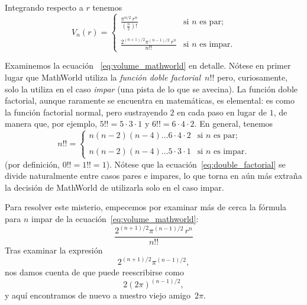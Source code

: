 Integrando respecto a $r$ tenemos
\begin{equation}
\label{eq:volume_mathworld}
V_n(r) = \begin{cases}
\displaystyle \frac{\pi^{n/2}\,r^n}{(\frac{n}{2})!} & \text{si } n \text{ es par}; \\ \\
\displaystyle \frac{2^{(n+1)/2}\pi^{(n-1)/2}\,r^n}{n!!} & \text{si } n \text{ es impar}.
\end{cases}
\end{equation}

Examinemos la ecuación ~\eqref{eq:volume_mathworld} en detalle. Nótese en primer lugar que MathWorld utiliza la \emph{función doble factorial}~$n!!$ pero, curiosamente, solo la utiliza en el caso \emph{impar} (una pista de lo que se avecina). La función doble factorial, aunque raramente se encuentra en matemáticas, es elemental: es como la función factorial normal, pero sustrayendo $2$ en cada paso en lugar de $1$, de manera que, por ejemplo, $5!! = 5 \cdot 3 \cdot 1$ y $6!! = 6 \cdot 4 \cdot 2$. En general, tenemos
\begin{equation}
\label{eq:double_factorial}
n!! = \begin{cases}
n(n-2)(n-4)\ldots6\cdot4\cdot2 & \text{si } n \text{ es par}; \\ \\
n(n-2)(n-4)\ldots5\cdot3\cdot1 & \text{si } n \text{ es impar}.
\end{cases}
\end{equation}
(por definición, $0!! = 1!! = 1$). Nótese que la ecuación~\eqref{eq:double_factorial} se divide naturalmente entre casos pares e impares, lo que torna en aún más extraña la decisión de MathWorld de utilizarla solo en el caso impar.

Para resolver este misterio, empecemos por examinar más de cerca la fórmula para $n$ impar de la ecuación~\eqref{eq:volume_mathworld}:
\[ \frac{2^{(n+1)/2}\pi^{(n-1)/2}\,r^n}{n!!} \]
Tras examinar la expresión
\[ 2^{(n+1)/2}\pi^{(n-1)/2}, \]
nos damos cuenta de que puede reescribirse como
\[ 2(2\pi)^{(n-1)/2}, \]
y aquí encontramos de nuevo a nuestro viejo amigo~$2\pi$.

